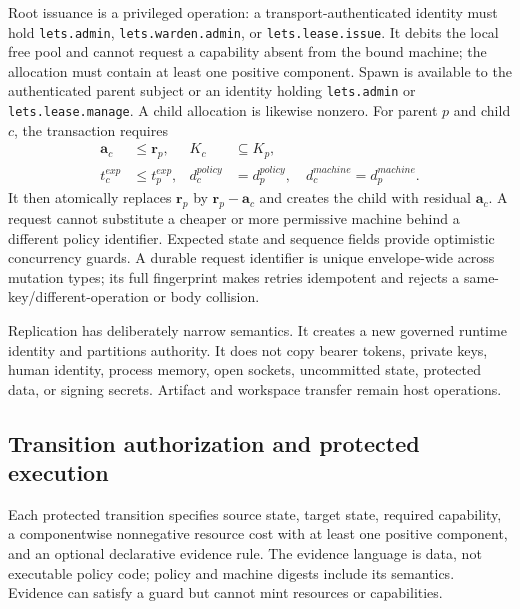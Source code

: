 \documentclass[10pt]{article}
\newcommand{\vect}[1]{\boldsymbol{#1}}
\newcommand{\code}[1]{\nolinkurl{#1}}
\begin{document}
Root issuance is a privileged operation: a transport-authenticated identity must hold
\code{lets.admin}, \code{lets.warden.admin}, or \code{lets.lease.issue}. It debits the local free
pool and cannot request a capability absent from the bound machine; the allocation must contain at
least one positive component. Spawn is available to the authenticated parent subject or an identity holding
\code{lets.admin} or \code{lets.lease.manage}. A child allocation is likewise nonzero. For parent
$p$ and child $c$, the transaction requires
\begin{align}
  \vect{a}_c &\leq \vect{r}_p, &
  K_c &\subseteq K_p, \\
  t^{exp}_c &\leq t^{exp}_p, &
  d^{policy}_c &= d^{policy}_p,\quad d^{machine}_c=d^{machine}_p.
\end{align}
It then atomically replaces $\vect{r}_p$ by $\vect{r}_p-\vect{a}_c$ and creates the child with
residual $\vect{a}_c$. A request cannot substitute a cheaper or more permissive machine behind a
different policy identifier. Expected state and sequence fields provide optimistic concurrency
guards. A durable request identifier is unique envelope-wide across mutation types; its full
fingerprint makes retries idempotent and rejects a same-key/different-operation or body collision.

Replication has deliberately narrow semantics. It creates a new governed runtime identity and
partitions authority. It does not copy bearer tokens, private keys, human identity, process memory,
open sockets, uncommitted state, protected data, or signing secrets. Artifact and workspace
transfer remain host operations.

\subsection{Transition authorization and protected execution}

Each protected transition specifies source state, target state, required capability, a
componentwise nonnegative resource cost with at least one positive component, and an optional
declarative evidence rule. The evidence language is data, not executable policy code; policy and
machine digests include its semantics. Evidence can satisfy a guard but cannot mint resources or
capabilities.
\end{document}
